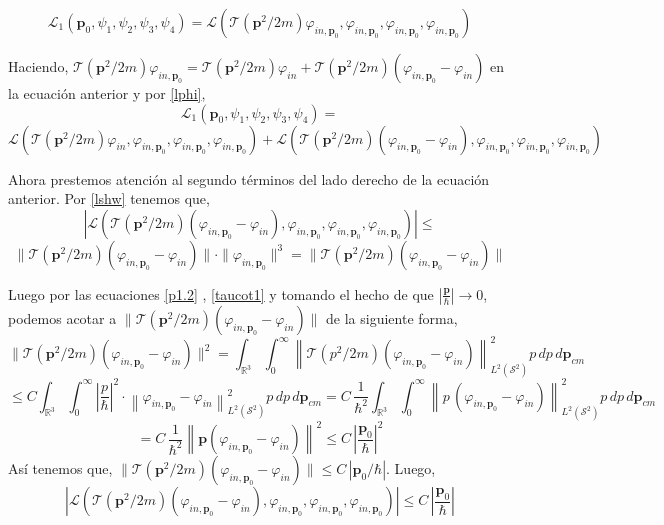 \documentclass[12pt]{book}
\numberwithin{equation}{chapter}
\def\n{\noindent}
\def\R{\mathbb{R}}
\def\S{\mathcal{S}}
\def\T{\mathcal{T}}
\def\L{\mathcal{L}}
\def\vp{\varphi}
\def\P{\mathbf{p}}
\begin{document}
\begin{equation}
\L_{1}(\P_{0}, \psi_{1},\psi_{2},\psi_{3},\psi_{4})=
\L(\T (\P^{2}/2m) \vp_{in,\P_{0}},\vp_{in,\P_{0}},\vp_{in,\P_{0}},\vp_{in,\P_{0}} )
\end{equation}

\newpage

Haciendo, $\T (\P^{2}/2m) \vp_{in,\P_{0}}= \T (\P^{2}/2m) \vp_{in}+ \T (\P^{2}/2m)( \vp_{in,\P_{0}} - \vp_{in} )  $ en la ecuaci\'on anterior y por \eqref{lphi},
$$ \L_{1}(\P_{0}, \psi_{1},\psi_{2},\psi_{3},\psi_{4})=  $$
\begin{equation}\label{l12}
\L(\T (\P^{2}/2m) \vp_{in},\vp_{in,\P_{0}},\vp_{in,\P_{0}},\vp_{in,\P_{0}} )+
\L( \T (\P^{2}/2m)( \vp_{in,\P_{0}} - \vp_{in} ) ,\vp_{in,\P_{0}},\vp_{in,\P_{0}},\vp_{in,\P_{0}} )
\end{equation}

\n Ahora prestemos atenci\'on al segundo t\'erminos del lado derecho de la ecuaci\'on anterior. Por \eqref{lshw} tenemos que,
$$ \left|\L( \T (\P^{2}/2m)( \vp_{in,\P_{0}} - \vp_{in} ) ,\vp_{in,\P_{0}},\vp_{in,\P_{0}},\vp_{in,\P_{0}} ) \right| \leq $$
$$ \| \T (\P^{2}/2m)( \vp_{in,\P_{0}} - \vp_{in} ) \| \cdot \| \vp_{in,\P_{0}} \|^{3} = \| \T (\P^{2}/2m)( \vp_{in,\P_{0}} - \vp_{in} ) \| $$

\n Luego por las ecuaciones \eqref{p1.2} , \eqref{taucot1} y tomando el hecho de que $ \left| \frac{\P}{\hbar} \right| \rightarrow 0 $, podemos acotar a $\| \T (\P^{2}/2m)( \vp_{in,\P_{0}} - \vp_{in} ) \|$ de la siguiente forma,
$$ \| \T(\P^{2}/2m) ( \vp_{in,\P_{0}} - \vp_{in} ) \|^{2}= \int_{\R^{3}} \int_{0}^{\infty} \left\| \T(p^{2}/2m) ( \vp_{in,\P_{0}} - \vp_{in} ) \right\|_{L^{2}(\S^{2})}^{2} p\, dp \, d \P_{cm} $$
$$ \leq C \int_{\R^{3}} \int_{0}^{\infty} \left| \frac{p}{\hbar} \right|^{2} \cdot \left\| \vp_{in,\P_{0}} - \vp_{in}  \right\|_{L^{2}(\S^{2})}^{2} p\, dp \, d \P_{cm} = C\, \frac{1}{\hbar^{2}} \int_{\R^{3}} \int_{0}^{\infty} \left\|p\, (\vp_{in,\P_{0}} - \vp_{in})  \right\|_{L^{2}(\S^{2})}^{2} p\, dp \, d \P_{cm}  $$
$$ =C \, \frac{1}{\hbar^{2}} \left\| \P(\vp_{in,\P_{0}} - \vp_{in}) \right\|^{2} \leq C \, \left|\frac{\P_{0}}{\hbar} \right|^{2} $$
As\'i tenemos que, $ \| \T (\P^{2}/2m)( \vp_{in,\P_{0}} - \vp_{in} ) \| \leq C\, |\P_{0}/\hbar| $. Luego,
$$ \left|\L( \T (\P^{2}/2m)( \vp_{in,\P_{0}} - \vp_{in} ) ,\vp_{in,\P_{0}},\vp_{in,\P_{0}},\vp_{in,\P_{0}} ) \right| \leq C \, \left|\frac{\P_{0}}{\hbar} \right| $$
\end{document}
